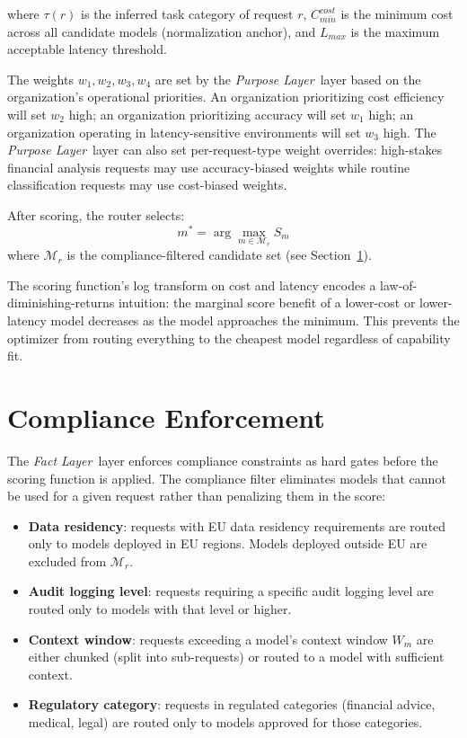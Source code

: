 \documentclass[12pt]{article}
\newcommand{\purpose}{\textit{Purpose Layer}}
\newcommand{\fact}{\textit{Fact Layer}}
\begin{document}
where $\tau(r)$ is the inferred task category of request $r$, $C_{min}^{cost}$ is the minimum cost across all candidate models (normalization anchor), and $L_{max}$ is the maximum acceptable latency threshold.

The weights $w_1, w_2, w_3, w_4$ are set by the \purpose\ layer based on the organization's operational priorities. An organization prioritizing cost efficiency will set $w_2$ high; an organization prioritizing accuracy will set $w_1$ high; an organization operating in latency-sensitive environments will set $w_3$ high. The \purpose\ layer can also set per-request-type weight overrides: high-stakes financial analysis requests may use accuracy-biased weights while routine classification requests may use cost-biased weights.

After scoring, the router selects:
\begin{equation}
m^* = \arg\max_{m \in \mathcal{M}_{r}} S_m
\label{eq:selection}
\end{equation}
where $\mathcal{M}_{r}$ is the compliance-filtered candidate set (see Section~\ref{sec:compliance}).

The scoring function's log transform on cost and latency encodes a law-of-diminishing-returns intuition: the marginal score benefit of a lower-cost or lower-latency model decreases as the model approaches the minimum. This prevents the optimizer from routing everything to the cheapest model regardless of capability fit.

\section{Compliance Enforcement}
\label{sec:compliance}

The \fact\ layer enforces compliance constraints as hard gates before the scoring function is applied. The compliance filter eliminates models that cannot be used for a given request rather than penalizing them in the score:

\begin{itemize}[noitemsep]
    \item \textbf{Data residency}: requests with EU data residency requirements are routed only to models deployed in EU regions. Models deployed outside EU are excluded from $\mathcal{M}_{r}$.
    \item \textbf{Audit logging level}: requests requiring a specific audit logging level are routed only to models with that level or higher.
    \item \textbf{Context window}: requests exceeding a model's context window $W_m$ are either chunked (split into sub-requests) or routed to a model with sufficient context.
    \item \textbf{Regulatory category}: requests in regulated categories (financial advice, medical, legal) are routed only to models approved for those categories.
\end{itemize}
\end{document}
